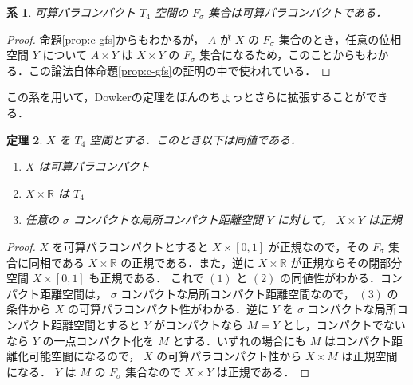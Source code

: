 \documentclass[leqno, 12pt]{ltjsarticle}
\newtheorem{thm}{定理}
\newtheorem{cor}[thm]{系}
\newcommand{\rr}{\mathbb{R}}
\begin{document}
\begin{cor}\label{cor:c-fs}
可算パラコンパクト
$T_{4}$
空間の
$F_{\sigma}$
集合は可算パラコンパクトである．
\end{cor}
\begin{proof}
命題\ref{prop:c-gfs}からもわかるが，
$A$
が
$X$
の
$F_{\sigma}$
集合のとき，任意の位相空間
$Y$
について
$A\times Y$
は
$X\times Y$
の
$F_{\sigma}$
集合になるため，このことからもわかる．この論法自体命題\ref{prop:c-gfs}の証明の中で使われている．
\end{proof}
この系を用いて，Dowkerの定理をほんのちょっとさらに拡張することができる．

\begin{thm}\label{thm:Dowker3}
$X$
を
$T_{4}$
空間とする．このとき以下は同値である．
\begin{enumerate}[label=\textup{(\arabic*)}]
\item
$X$
は可算パラコンパクト
\item
$X\times \rr$
は
$T_{4}$
\item 任意の
$\sigma$
コンパクトな局所コンパクト距離空間
$Y$
に対して，
$X\times Y$
は正規
\end{enumerate}
\end{thm}
\begin{proof}
$X$
を可算パラコンパクトとすると
$X\times [0,1]$
が正規なので，その
$F_{\sigma}$
集合に同相である
$X\times \rr$
の正規である．また，逆に
$X\times \rr$
が正規ならその閉部分空間
$X\times [0,1]$
も正規である．
これで
$(1)$
と
$(2)$
の同値性がわかる．コンパクト距離空間は，
$\sigma$
コンパクトな局所コンパクト距離空間なので，
$(3)$
の条件から
$X$
の可算パラコンパクト性がわかる．逆に
$Y$
を
$\sigma$
コンパクトな局所コンパクト距離空間とすると
$Y$
がコンパクトなら
$M=Y$
とし，コンパクトでないなら
$Y$
の一点コンパクト化を
$M$
とする．いずれの場合にも
$M$
はコンパクト距離化可能空間になるので，
$X$
の可算パラコンパクト性から
$X\times M$
は正規空間になる．
$Y$
は
$M$
の
$F_{\sigma}$
集合なので
$X\times Y$
は正規である．
\end{proof}
\end{document}
